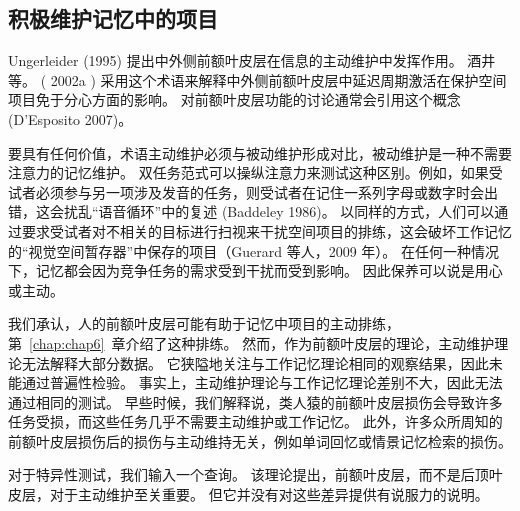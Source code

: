 \subsection{积极维护记忆中的项目}
Ungerleider (1995) 提出中外侧前额叶皮层在信息的主动维护中发挥作用。 酒井等。 ( 2002a ) 采用这个术语来解释中外侧前额叶皮层中延迟周期激活在保护空间项目免于分心方面的影响。 对前额叶皮层功能的讨论通常会引用这个概念 (D’Esposito 2007)。
\par 
要具有任何价值，术语主动维护必须与被动维护形成对比，被动维护是一种不需要注意力的记忆维护。 双任务范式可以操纵注意力来测试这种区别。例如，如果受试者必须参与另一项涉及发音的任务，则受试者在记住一系列字母或数字时会出错，这会扰乱“语音循环”中的复述 (Baddeley 1986)。 以同样的方式，人们可以通过要求受试者对不相关的目标进行扫视来干扰空间项目的排练，这会破坏工作记忆的“视觉空间暂存器”中保存的项目（Guerard 等人，2009 年）。 在任何一种情况下，记忆都会因为竞争任务的需求受到干扰而受到影响。 因此保养可以说是用心或主动。
\par 
我们承认，人的前额叶皮层可能有助于记忆中项目的主动排练，第~\ref{chap:chap6}~章介绍了这种排练。 然而，作为前额叶皮层的理论，主动维护理论无法解释大部分数据。 它狭隘地关注与工作记忆理论相同的观察结果，因此未能通过普遍性检验。 事实上，主动维护理论与工作记忆理论差别不大，因此无法通过相同的测试。 早些时候，我们解释说，类人猿的前额叶皮层损伤会导致许多任务受损，而这些任务几乎不需要主动维护或工作记忆。 此外，许多众所周知的 前额叶皮层损伤后的损伤与主动维持无关，例如单词回忆或情景记忆检索的损伤。
\par 
对于特异性测试，我们输入一个查询。 该理论提出，前额叶皮层，而不是后顶叶皮层，对于主动维护至关重要。 但它并没有对这些差异提供有说服力的说明。

